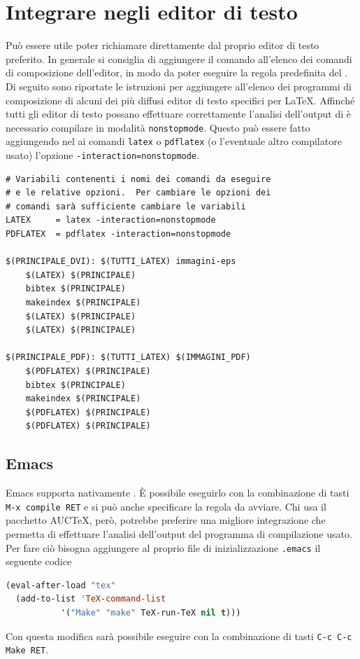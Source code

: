 \cleardoublepage{}
\chapter{Integrare  negli editor di testo}
\label{cha:editor}

Può essere utile poter richiamare  direttamente dal proprio
editor di testo preferito.  In generale si consiglia di aggiungere il comando
 all'elenco dei comandi di composizione dell'editor, in modo da
poter eseguire la regola predefinita del .  Di seguito sono
riportate le istruzioni per aggiungere  all'elenco dei programmi
di composizione di alcuni dei più diffusi editor di testo specifici per
\LaTeX{}.  Affinché tutti gli editor di testo possano effettuare correttamente
l'analisi dell'output di  è necessario compilare in modalità
\texttt{nonstopmode}.  Questo può essere fatto aggiungendo nel
 ai comandi \texttt{latex} o \texttt{pdflatex} (o
l'eventuale altro compilatore usato) l'opzione
\texttt{-interaction=nonstopmode}.
\begin{lstlisting}
# Variabili contenenti i nomi dei comandi da eseguire
# e le relative opzioni.  Per cambiare le opzioni dei
# comandi sarà sufficiente cambiare le variabili
LATEX     = latex -interaction=nonstopmode
PDFLATEX  = pdflatex -interaction=nonstopmode

$(PRINCIPALE_DVI): $(TUTTI_LATEX) immagini-eps
	$(LATEX) $(PRINCIPALE)
	bibtex $(PRINCIPALE)
	makeindex $(PRINCIPALE)
	$(LATEX) $(PRINCIPALE)
	$(LATEX) $(PRINCIPALE)

$(PRINCIPALE_PDF): $(TUTTI_LATEX) $(IMMAGINI_PDF)
	$(PDFLATEX) $(PRINCIPALE)
	bibtex $(PRINCIPALE)
	makeindex $(PRINCIPALE)
	$(PDFLATEX) $(PRINCIPALE)
	$(PDFLATEX) $(PRINCIPALE)
\end{lstlisting}

\section{Emacs}
\label{sec:emacs}

Emacs supporta nativamente .  È possibile eseguirlo con la
combinazione di tasti \texttt{M-x compile RET} e si può anche specificare la
regola da avviare.  Chi usa il pacchetto AUC\TeX{},
però, potrebbe preferire una migliore integrazione che permetta di effettuare
l'analisi dell'output del programma di compilazione usato.  Per fare ciò bisogna
aggiungere al proprio file di inizializzazione \texttt{.emacs} il seguente
codice
\begin{lstlisting}[language=lisp,morekeywords={eval-after-load,add-to-list}]
(eval-after-load "tex"
  (add-to-list 'TeX-command-list
	       '("Make" "make" TeX-run-TeX nil t)))
\end{lstlisting}
Con questa modifica sarà possibile eseguire  con la combinazione
di tasti \texttt{C-c C-c Make RET}.

